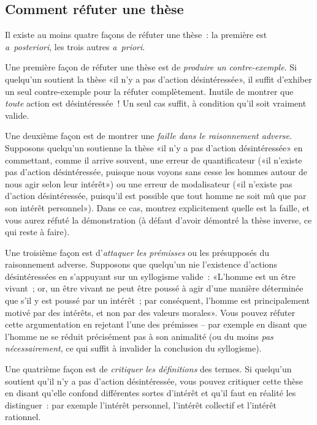 \documentclass[a4paper,11pt]{article}
\begin{document}
\subsection{Comment réfuter une thèse}

Il existe au moins quatre façons de réfuter une thèse~: la première est
\emph{a~posteriori}, les trois autres \emph{a~priori}.

\par

Une première façon de réfuter une thèse est de \emph{produire un
  contre-exemple}. Si quelqu'un soutient la thèse «il n'y a pas d'action
désintéressée», il suffit d'exhiber un seul contre-exemple pour la
réfuter complètement. Inutile de montrer que \emph{toute} action est
désintéressée~! Un seul cas suffit, à condition qu'il soit vraiment
valide.

\par

Une deuxième façon est de montrer une \emph{faille dans le raisonnement
  adverse}. Supposons quelqu'un soutienne la thèse «il n'y a pas
d'action désintéressée» en commettant, comme il arrive souvent, une
erreur de quantificateur («il n'existe pas d'action désintéressée,
puisque nous voyons sans cesse les hommes autour de nous agir selon leur
intérêt») ou une erreur de modalisateur («il n'existe pas d'action
désintéressée, puisqu'il est possible que tout homme ne soit mû que par
son intérêt personnel»). Dans ce cas, montrez explicitement quelle est
la faille, et vous aurez réfuté la démonstration (à défaut d'avoir
démontré la thèse inverse, ce qui reste à faire).

\par

Une troisième façon est d'\emph{attaquer les prémisses} ou les
présupposés du raisonnement adverse. Supposons que quelqu'un nie
l'existence d'actions désintéressées en s'appuyant sur un syllogisme
valide~: «L'homme est un être vivant~; or, un être vivant ne peut être
poussé à agir d'une manière déterminée que s'il y est poussé par un
intérêt~; par conséquent, l'homme est principalement motivé par des
intérêts, et non par des valeurs morales». Vous pouvez réfuter cette
argumentation en rejetant l'une des prémisses -- par exemple en disant
que l'homme ne se réduit précisément pas à son animalité (ou du moins
\emph{pas nécessairement}, ce qui suffit à invalider la conclusion du
syllogisme).

\par

Une quatrième façon est de \emph{critiquer les définitions} des termes.
Si quelqu'un soutient qu'il n'y a pas d'action désintéressée, vous
pouvez critiquer cette thèse en disant qu'elle confond différentes
sortes d'intérêt et qu'il faut en réalité les distinguer~: par exemple
l'intérêt personnel, l'intérêt collectif et l'intérêt rationnel.
\end{document}
